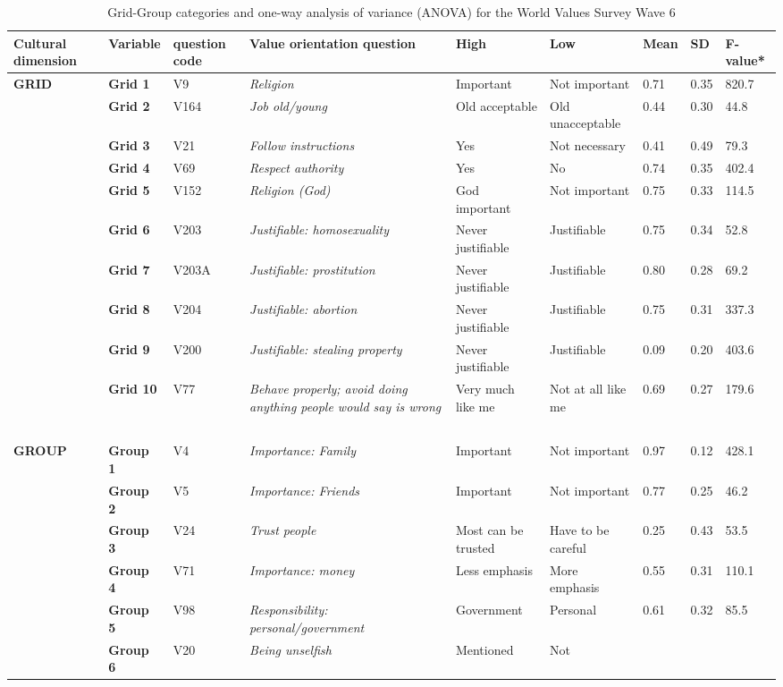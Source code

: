 \documentclass[12pt, a4paper]{article}
\begin{document}
\begin{table}
\caption{Grid-Group categories and one-way analysis of variance (ANOVA) for the World Values Survey Wave 6}
\label{table: WVS grid-group questions}
\begin{adjustbox}{width=\textwidth}
\begin{tabular}[]{p{}lp{}p{}lllll}
\toprule
\textbf{Cultural dimension} &
\textbf{Variable} & 
\textbf{question code} & 
\textbf{Value orientation
question} & 
\textbf{High } & 
\textbf{Low} & 
\textbf{Mean} & 
\textbf{SD} & \textbf{F-value*}
\tabularnewline
\midrule
\textbf{GRID} & \textbf{Grid 1} & V9 & \emph{Religion} & Important & Not
important & 0.71 & 0.35 & 820.7\tabularnewline
& \textbf{Grid 2} & V164 & \emph{Job old/young} & Old acceptable & Old
unacceptable & 0.44 & 0.30 & 44.8\tabularnewline
& \textbf{Grid 3} & V21 & \emph{Follow instructions} & Yes & Not
necessary & 0.41 & 0.49 & 79.3\tabularnewline
& \textbf{Grid 4} & V69 & \emph{Respect authority} & Yes & No & 0.74 &
0.35 & 402.4\tabularnewline
& \textbf{Grid 5} & V152 & \emph{Religion (God)} & God important & Not
important & 0.75 & 0.33 & 114.5\tabularnewline
& \textbf{Grid 6} & V203 & \emph{Justifiable: homosexuality} & Never
justifiable & Justifiable & 0.75 & 0.34 & 52.8\tabularnewline
& \textbf{Grid 7} & V203A & \emph{Justifiable: prostitution} & Never
justifiable & Justifiable & 0.80 & 0.28 & 69.2\tabularnewline
& \textbf{Grid 8} & V204 & \emph{Justifiable: abortion} & Never
justifiable & Justifiable & 0.75 & 0.31 & 337.3\tabularnewline
& \textbf{Grid 9} & V200 & \emph{Justifiable: stealing property} & Never
justifiable & Justifiable & 0.09 & 0.20 & 403.6\tabularnewline
& \textbf{Grid 10} & V77 & \emph{Behave properly; avoid doing anything
people would say is wrong} & Very much like me & Not at all like me &
0.69 & 0.27 & 179.6\tabularnewline
& \textbf{~} & ~ & ~ & ~ & ~ & ~ & ~ & ~\tabularnewline
\textbf{GROUP} & \textbf{Group 1} & V4 & \emph{Importance: Family} &
Important & Not important & 0.97 & 0.12 & 428.1\tabularnewline
& \textbf{Group 2} & V5 & \emph{Importance: Friends} & Important & Not
important & 0.77 & 0.25 & 46.2\tabularnewline
& \textbf{Group 3} & V24 & \emph{Trust people} & Most can be trusted &
Have to be careful & 0.25 & 0.43 & 53.5\tabularnewline
& \textbf{Group 4} & V71 & \emph{Importance: money} & Less emphasis &
More emphasis & 0.55 & 0.31 & 110.1\tabularnewline
& \textbf{Group 5} & V98 & \emph{Responsibility: personal/government} &
Government & Personal & 0.61 & 0.32 & 85.5\tabularnewline
& \textbf{Group 6} & V20 & \emph{Being unselfish} & Mentioned & Not

\end{tabular}
\end{adjustbox}
\end{table}
\end{document}
